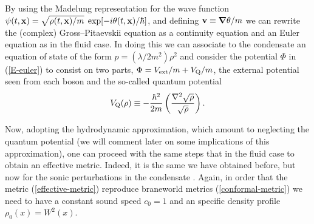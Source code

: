 \documentclass[a4paper,prl,showpacs,twocolumn]{revtex4}
\begin{document}
By using the Madelung representation 
for the wave function
$\psi(t,{\mathbf x}) = \sqrt{\rho(t,{\mathbf x})/ m} \; \exp[-i \theta(t,{\mathbf x}) / \hbar]$,
and defining ${\mathbf v} \equiv \mbox{\boldmath$\nabla$} \theta /m$
we can rewrite the (complex) Gross--Pitaevskii equation 
as a continuity equation and an Euler equation as in the fluid case.
In doing this we can associate to the condensate an
equation of state of the form $p=(\lambda/2m^2)\rho^2$
and consider the potential $\Phi$ in (\ref{E-euler}) to consist on 
two parts, $\Phi=V_{\rm ext}/m+V_{\rm Q}/m$,
the external potential seen from each boson
and the so-called quantum potential 
%
\begin{equation}
V_{\rm Q}(\rho) \equiv  - {\hbar^2 \over 2 m} 
\left( {\nabla^2 \sqrt\rho\over\sqrt\rho} \right).
\label{quantum-potential}
\end{equation}
%

Now, adopting the hydrodynamic approximation, which amount to
neglecting the quantum potential (we will comment later on some implications
of this approximation), one can proceed with the same steps
that in the fluid case to obtain an effective metric. 
Indeed, it is the same we have obtained before, but now for the sonic 
perturbations in the condensate \cite{garay,barcelo}. 
Again, in order that the 
metric (\ref{effective-metric}) reproduce braneworld metrics 
(\ref{conformal-metric}) we need to have a constant sound speed $c_0=1$
and an specific density profile $\rho_0(x)=W^2(x)$.
\end{document}

